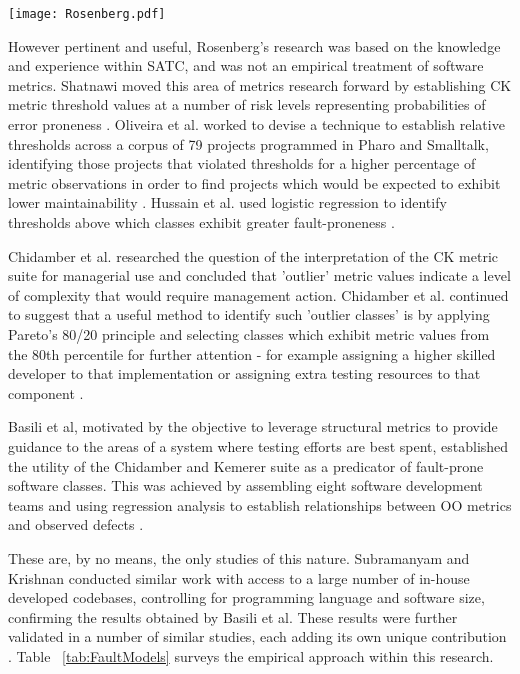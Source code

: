 \begin{table}
\begin{tabular}
 \centering 
 \texttt{[image: Rosenberg.pdf]}
 \label{tab:rosenberg}
\end{tabular}
\end{table}


However pertinent and useful, Rosenberg's research was based on the knowledge and experience within SATC, and was not an empirical treatment of software metrics. Shatnawi moved this area of metrics research forward by establishing CK metric threshold values at a number of risk levels representing probabilities of error proneness \citep{shatnawi2010quantitative}. Oliveira et al. worked to devise a technique to establish relative thresholds across a corpus of 79 projects programmed in Pharo and Smalltalk, identifying those projects that violated thresholds for a higher percentage of metric observations in order to find projects which would be expected to exhibit lower maintainability \citep{oliveira2015validating}. Hussain et al. used logistic regression to identify thresholds above which classes exhibit greater fault-proneness \citep{hussain2016detection}.

Chidamber et al. researched the question of the interpretation of the CK metric suite for managerial use and concluded that 'outlier' metric values indicate a level of complexity that would require management action. Chidamber et al. continued to suggest that a useful method to identify such 'outlier classes' is by applying Pareto's 80/20 principle and selecting classes which exhibit metric values from the 80th percentile for further attention - for example assigning a higher skilled developer to that implementation or assigning extra testing resources to that component \citep{chidamber1998managerial}.

Basili et al, motivated by the objective to leverage structural metrics to provide guidance to the areas of a system where testing efforts are best spent, established the utility of the Chidamber and Kemerer suite as a predicator of fault-prone software classes. This was achieved by assembling eight software development teams and using regression analysis to establish relationships between OO metrics and observed defects \citep{basili1996validation}. 

These are, by no means, the only studies of this nature. Subramanyam and Krishnan \citep{subramanyam2003empirical} conducted similar work with access to a large number of in-house developed codebases, controlling for programming language and software size, confirming the results obtained by Basili et al. These results were further validated in a number of similar studies, each adding its own unique contribution \citep{el1999validation, tang1999empirical, cartwright2000empirical, el2001prediction, subramanyam2003empirical, gyimothy2005empirical, xu2008empirical, malhotra2012fault, okutan2014software, song2018comprehensive}. Table ~\ref{tab:FaultModels} surveys the empirical approach within this research.

